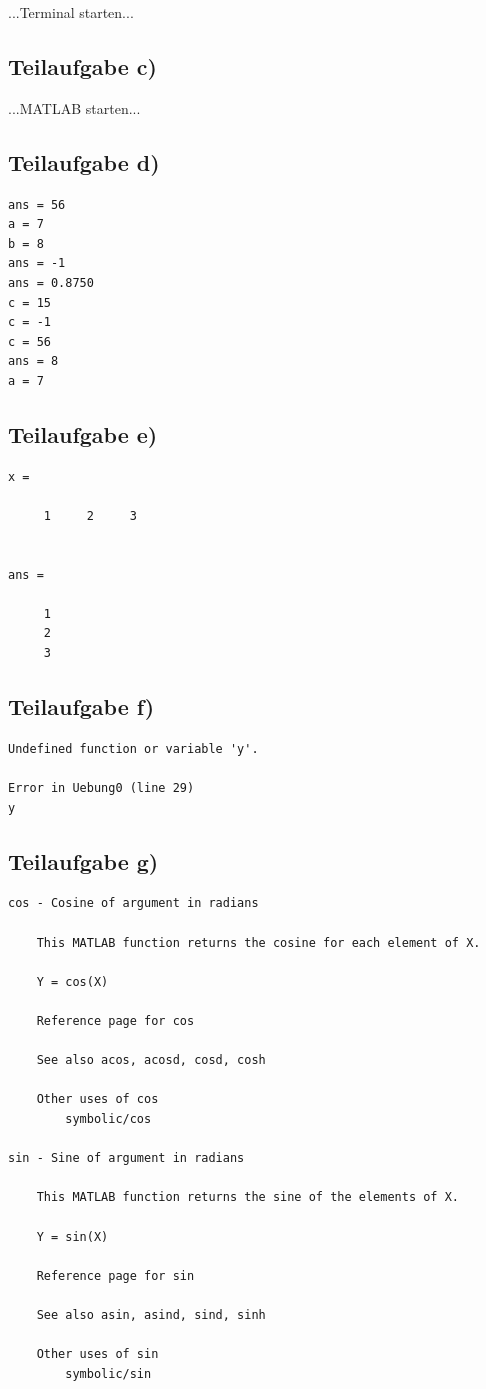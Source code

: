 \documentclass{llncs}
\begin{document}
...Terminal starten...

\subsection*{Teilaufgabe c)}

...MATLAB starten...

\subsection*{Teilaufgabe d)}

\begin{verbatim}
ans = 56
a = 7
b = 8
ans = -1
ans = 0.8750
c = 15
c = -1
c = 56
ans = 8
a = 7
\end{verbatim}


\subsection*{Teilaufgabe e)}

\begin{verbatim}
x =

     1     2     3


ans =

     1
     2
     3
\end{verbatim}


\subsection*{Teilaufgabe f)}

\begin{verbatim}
Undefined function or variable 'y'.

Error in Uebung0 (line 29)
y
\end{verbatim}
\newpage

\subsection*{Teilaufgabe g)}

\begin{verbatim}
cos - Cosine of argument in radians

    This MATLAB function returns the cosine for each element of X.

    Y = cos(X)

    Reference page for cos

    See also acos, acosd, cosd, cosh

    Other uses of cos
        symbolic/cos

sin - Sine of argument in radians

    This MATLAB function returns the sine of the elements of X.

    Y = sin(X)

    Reference page for sin

    See also asin, asind, sind, sinh

    Other uses of sin
        symbolic/sin
\end{verbatim}
\end{document}
